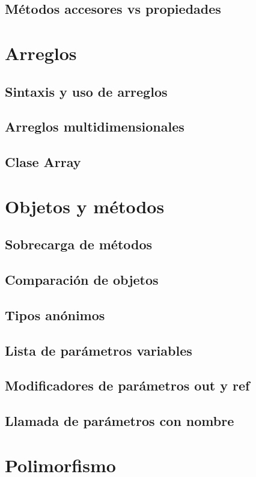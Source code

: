\documentclass[12pt,a4paper]{report}
\begin{document}
{\section{Métodos accesores vs propiedades}

\chapter{Arreglos}
\section{Sintaxis y uso de arreglos}
\section{Arreglos multidimensionales}
\section{Clase Array}

\chapter{Objetos y métodos}
\section{Sobrecarga de métodos}
\section{Comparación de objetos}
\section{Tipos anónimos}
\section{Lista de parámetros variables}
\section{Modificadores de parámetros out y ref}
\section{Llamada de parámetros con nombre}

\chapter{Polimorfismo}
}
\end{document}
